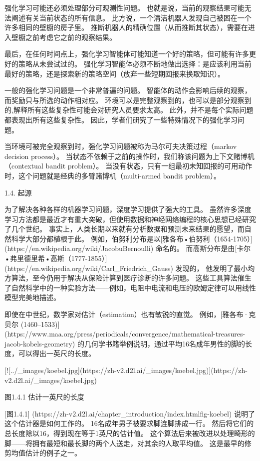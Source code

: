 强化学习可能还必须处理部分可观测性问题。 也就是说，当前的观察结果可能无法阐述有关当前状态的所有信息。 比方说，一个清洁机器人发现自己被困在一个许多相同的壁橱的房子里。 推断机器人的精确位置（从而推断其状态），需要在进入壁橱之前考虑它之前的观察结果。

最后，在任何时间点上，强化学习智能体可能知道一个好的策略，但可能有许多更好的策略从未尝试过的。 强化学习智能体必须不断地做出选择：是应该利用当前最好的策略，还是探索新的策略空间（放弃一些短期回报来换取知识）。

一般的强化学习问题是一个非常普遍的问题。 智能体的动作会影响后续的观察，而奖励只与所选的动作相对应。 环境可以是完整观察到的，也可以是部分观察到的,解释所有这些复杂性可能会对研究人员要求太高。 此外，并不是每个实际问题都表现出所有这些复杂性。 因此，学者们研究了一些特殊情况下的强化学习问题。

当环境可被完全观察到时，强化学习问题被称为马尔可夫决策过程（markov decision process）。 当状态不依赖于之前的操作时，我们称该问题为上下文赌博机（contextual bandit problem）。 当没有状态，只有一组最初未知回报的可用动作时，这个问题就是经典的多臂赌博机（multi-armed bandit problem）。

 1.4. 起源

为了解决各种各样的机器学习问题，深度学习提供了强大的工具。 虽然许多深度学习方法都是最近才有重大突破，但使用数据和神经网络编程的核心思想已经研究了几个世纪。 事实上，人类长期以来就有分析数据和预测未来结果的愿望，而自然科学大部分都植根于此。 例如，伯努利分布是以[雅各布•伯努利（1654-1705）]
(https://en.wikipedia.org/wiki/JacobuBernoulli)
命名的。 而高斯分布是由[卡尔•弗里德里希•高斯（1777-1855）]
(https://en.wikipedia.org/wiki/Carl\_Friedrich\_Gauss)
发现的， 他发明了最小均方算法，至今仍用于解决从保险计算到医疗诊断的许多问题。 这些工具算法催生了自然科学中的一种实验方法——例如，电阻中电流和电压的欧姆定律可以用线性模型完美地描述。

即使在中世纪，数学家对估计（estimation）也有敏锐的直觉。 例如，[雅各布·克贝尔 (1460–1533)]
(https://www.maa.org/press/periodicals/convergence/mathematical-treasures-jacob-kobels-geometry)
的几何学书籍举例说明，通过平均16名成年男性的脚的长度，可以得出一英尺的长度。

[![../\_images/koebel.jpg](https://zh-v2.d2l.ai/\_images/koebel.jpg)](https://zh-v2.d2l.ai/\_images/koebel.jpg)

图1.4.1 估计一英尺的长度

[图1.4.1]
(https://zh-v2.d2l.ai/chapter\_introduction/index.htmlfig-koebel) 
说明了这个估计器是如何工作的。 16名成年男子被要求脚连脚排成一行。 然后将它们的总长度除以16，得到现在等于1英尺的估计值。 这个算法后来被改进以处理畸形的脚——将拥有最短和最长脚的两个人送走，对其余的人取平均值。 这是最早的修剪均值估计的例子之一。

